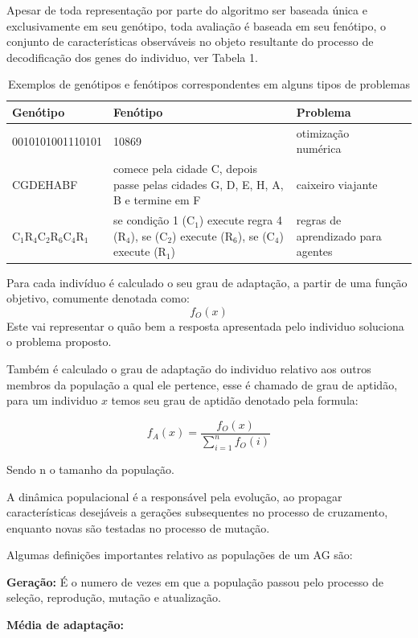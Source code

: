 Apesar de toda representação por parte do algoritmo ser baseada única e exclusivamente em seu genótipo, toda avaliação é baseada em seu fenótipo, o conjunto de características observáveis no objeto resultante do processo de decodificação dos genes do individuo, ver Tabela 1.

\begin{table}[h]
	\centering
\vspace{1.0cm}
	\begin{tabular}{lp{3.0cm}lp{10.0cm}|}
		Genótipo & Fenótipo & Problema \\
		\hline                               
		0010101001110101 & 10869  & otimização numérica \\
		CGDEHABF & comece pela cidade C, depois passe pelas cidades G, D, E, H, A, B e termine em F  & caixeiro viajante \\
		C$_1$R$_4$C$_2$R$_6$C$_4$R$_1$ & se condição 1 (C$_1$) execute regra 4 (R$_4$), se (C$_2$) execute (R$_6$), se (C$_4$) execute (R$_1$)  & regras de aprendizado para agentes \\
	\end{tabular}
		\caption{Exemplos de genótipos e fenótipos correspondentes em alguns tipos de problemas \cite{DiogoCLucas}}
\end{table}	

Para cada indivíduo é calculado o seu grau de adaptação, a partir de uma função objetivo, comumente denotada como:
\[f_O(x)\]  
Este vai representar o quão bem a resposta apresentada pelo individuo soluciona o problema proposto.

Também é calculado o grau de adaptação do individuo relativo aos outros membros da população a qual ele pertence, esse é chamado de grau de aptidão, para um individuo $x$ temos seu grau de aptidão denotado pela formula:

\[f_A(x) = \frac{f_O(x)}{ \sum_{i=1}^{n}  f_O(i)  }  \]

 Sendo n o tamanho da população.
 
 A dinâmica populacional é a responsável pela evolução, ao propagar características desejáveis a gerações subsequentes no processo de cruzamento, enquanto novas são testadas no processo de mutação.
 
 Algumas definições importantes relativo as populações de um AG são:
 
 \textbf{Geração:} É o numero de vezes em que a população passou pelo processo de seleção, reprodução, mutação e atualização.

\textbf{Média de adaptação:} 

